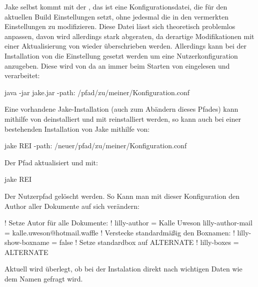 \begin{bemerkung}[Standartkonfigurationsdateien]
    Jake selbst kommt mit der , das ist eine Konfigurationsdatei, die für den aktuellen Build Einstellungen setzt, ohne jedesmal die in den  vermerkten Einstellungen zu modifizieren. Diese Datei lässt sich theoretisch problemlos anpassen, davon wird allerdings stark abgeraten, da derartige Modifikationen mit einer Aktualisierung von \Jake wieder überschrieben werden. Allerdings kann bei der Installation von \Jake die Einstellung  gesetzt werden um eine Nutzerkonfiguration anzugeben. Diese wird von da an immer beim Starten von \Jake eingelesen und verarbeitet:
    \begin{bash*}
java -jar jake.jar -path: /pfad/zu/meiner/Konfiguration.conf
    \end{bash*}
    Eine vorhandene Jake-Installation (auch zum Abändern dieses Pfades) kann mithilfe von  deinstalliert und mit  reinstalliert werden, so kann auch bei einer bestehenden Installation von Jake mithilfe von:
    \begin{bash*}
jake REI -path: /neuer/pfad/zu/meiner/Konfiguration.conf
    \end{bash*}
    Der Pfad aktualisiert und mit:
    \begin{bash*}
jake REI
    \end{bash*}
    Der Nutzerpfad gelöscht werden. So Kann man mit dieser Konfiguration den Author aller Dokumente auf sich verändern:
    \begin{gepard}
! Setze Autor für alle Dokumente: !
lilly-author       = Kalle Uweson
lilly-author-mail  = kalle.uweson@hotmail.waffle
! Verstecke standardmäßig den Boxnamen: !
lilly-show-boxname = false
! Setze standardbox auf ALTERNATE !
lilly-boxes        = ALTERNATE
    \end{gepard}
    Aktuell wird überlegt, ob bei der Instalation direkt nach wichtigen Daten wie dem Namen gefragt wird.
\end{bemerkung}

